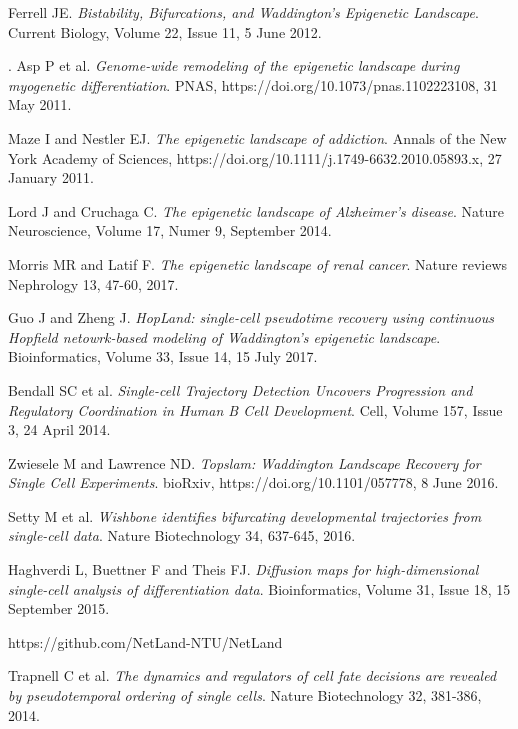 \documentclass[journal, a4paper]{IEEEtran}
\begin{document}
\begin{thebibliography}{99}
	Ferrell JE. \textit{Bistability, Bifurcations, and Waddington's Epigenetic Landscape}.
	Current Biology, Volume 22, Issue 11, 5 June 2012.
	
	.
	Asp P et al. \textit{Genome-wide remodeling of the epigenetic landscape during myogenetic differentiation}.
	PNAS, https://doi.org/10.1073/pnas.1102223108, 31 May 2011.
	
	Maze I and Nestler EJ. \textit{The epigenetic landscape of addiction}.
	Annals of the New York Academy of Sciences, https://doi.org/10.1111/j.1749-6632.2010.05893.x, 27 January 2011.
	
	Lord J and Cruchaga C. \textit{The epigenetic landscape of Alzheimer's disease}.
	Nature Neuroscience, Volume 17, Numer 9, September 2014.
	
	Morris MR and Latif F. \textit{The epigenetic landscape of renal cancer}.
	Nature reviews Nephrology 13, 47-60, 2017.
	
	
	
	Guo J and Zheng J. \textit{HopLand: single-cell pseudotime recovery using continuous Hopfield netowrk-based modeling of Waddington's epigenetic landscape}.
	Bioinformatics, Volume 33, Issue 14, 15 July 2017.
	
	Bendall SC et al. \textit{Single-cell Trajectory Detection Uncovers Progression and Regulatory Coordination in Human B Cell Development}.
	Cell, Volume 157, Issue 3, 24 April 2014.
	
	Zwiesele M and Lawrence ND. \textit{Topslam: Waddington Landscape Recovery for Single Cell Experiments}.
	bioRxiv, https://doi.org/10.1101/057778, 8 June 2016.
	
	Setty M et al. \textit{Wishbone identifies bifurcating developmental trajectories from single-cell data}.
	Nature Biotechnology 34, 637-645, 2016.
	
	Haghverdi L, Buettner F and Theis FJ. \textit{Diffusion maps for high-dimensional single-cell analysis of differentiation data}.
	Bioinformatics, Volume 31, Issue 18, 15 September 2015.
	
	https://github.com/NetLand-NTU/NetLand
	
	Trapnell C et al. \textit{The dynamics and regulators of cell fate decisions are revealed by pseudotemporal ordering of single cells}.
	Nature Biotechnology 32, 381-386, 2014.
	

\end{thebibliography}
\end{document}
